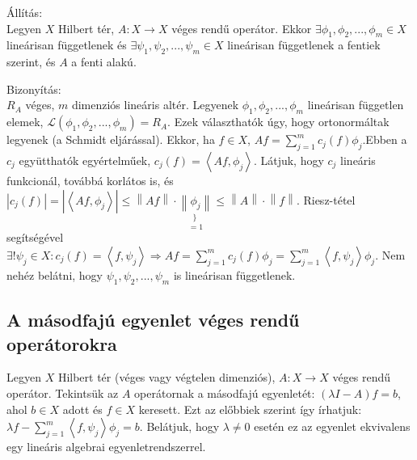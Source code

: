 \documentclass[12pt,a4paper]{scrartcl}
\newenvironment{bizonyitas}{}{}
\newenvironment{allitas}{}{}
\begin{document}
\begin{allitas}

Állítás:\\
Legyen \(X\) Hilbert tér, \(\left. A:X\rightarrow X \right.\) véges
rendű operátor. Ekkor \(\exists\phi_{1},\phi_{2},...,\phi_{m} \in X\)
lineárisan függetlenek és
\(\exists\psi_{1},\psi_{2},...,\psi_{m} \in X\) lineárisan függetlenek a
fentiek szerint, és \(A\) a fenti alakú.

\end{allitas}

\begin{bizonyitas}

Bizonyítás:\\
\(R_{A}\) véges, \(m\) dimenziós lineáris altér. Legyenek
\(\phi_{1},\phi_{2},...,\phi_{m}\) lineárisan független elemek,
\(\mathcal{L}\left( {\phi_{1},\phi_{2},...,\phi_{m}} \right) = R_{A}\).
Ezek választhatók úgy, hogy ortonormáltak legyenek (a Schmidt
eljárással). Ekkor, ha \(f \in X\),
\(Af = {\sum\limits_{j = 1}^{m}{c_{j}\left( f \right)\phi_{j}}}\).Ebben
a \(c_{j}\) együtthatók egyértelműek,
\(c_{j}\left( f \right) = \left\langle {Af,\phi_{j}} \right\rangle\).
Látjuk, hogy \(c_{j}\) lineáris funkcionál, továbbá korlátos is, és
\(\left| {c_{j}\left( f \right)} \right| = \left| \left\langle {Af,\phi_{j}} \right\rangle \right| \leq \left\| {Af} \right\| \cdot \underset{= 1}{\underset{\}\ }{\left\| \phi_{j} \right\|}} \leq \left\| A \right\| \cdot \left\| f \right\|\).
Riesz-tétel segítségével
\(\left. \exists!\psi_{j} \in X:c_{j}\left( f \right) = \left\langle {f,\psi_{j}} \right\rangle\Rightarrow Af = {\sum\limits_{j = 1}^{m}{c_{j}\left( f \right)\phi_{j}}} = {\sum\limits_{j = 1}^{m}{\left\langle {f,\psi_{j}} \right\rangle\phi_{j}}} \right.\).
Nem nehéz belátni, hogy \(\psi_{1},\psi_{2},...,\psi_{m}\) is lineárisan
függetlenek.

\end{bizonyitas}

\hypertarget{a-masodfaju-egyenlet-veges-rendu-operatorokra}{%
\subsection{A másodfajú egyenlet véges rendű
operátorokra}\label{a-masodfaju-egyenlet-veges-rendu-operatorokra}}

Legyen \(X\) Hilbert tér (véges vagy végtelen dimenziós),
\(\left. A:X\rightarrow X \right.\) véges rendű operátor. Tekintsük az
\(A\) operátornak a másodfajú egyenletét:
\(\left( {\lambda I - A} \right)f = b\), ahol \(b \in X\) adott és
\(f \in X\) keresett. Ezt az előbbiek szerint így írhatjuk:
\(\lambda f - {\sum\limits_{j = 1}^{m}{\left\langle {f,\psi_{j}} \right\rangle\phi_{j}}} = b\).
Belátjuk, hogy \(\lambda \neq 0\) esetén ez az egyenlet ekvivalens egy
lineáris algebrai egyenletrendszerrel.
\end{document}
